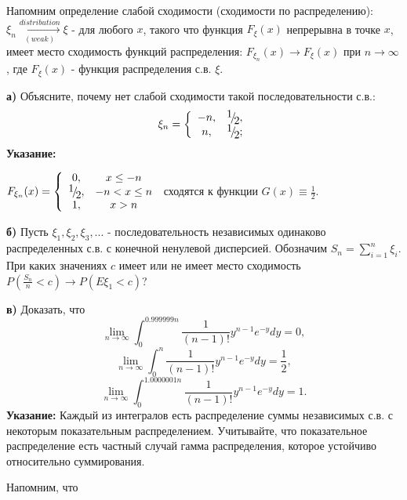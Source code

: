 \begin{problem}
Напомним определение слабой сходимости (сходимости по распределению): $\xi _{n} \mathop{\to }\limits_{(weak)}^{distribution} \xi $ - для любого $x$, такого что функция $F_{\xi } (x)$ непрерывна в точке $x$, имеет место сходимость функций распределения: $F_{\xi _{n} } (x)\to F_{\xi } (x)$ при $n\to \infty $, где $F_{\xi } (x)$ - функция распределения с.в. $\xi $.

\noindent \textbf{а)} Объясните, почему нет слабой сходимости такой последовательности с.в.:
\[\xi _{n} =\left\{\begin{array}{cc} {-n,} & {{\raise0.7ex\hbox{$ 1 $}\!\mathord{\left/ {\vphantom {1 2}} \right. \kern-\nulldelimiterspace}\!\lower0.7ex\hbox{$ 2 $}} ,} \\ {n,} & {{\raise0.7ex\hbox{$ 1 $}\!\mathord{\left/ {\vphantom {1 2}} \right. \kern-\nulldelimiterspace}\!\lower0.7ex\hbox{$ 2 $}} ;} \end{array}\right. \] 
\textbf{Указание: }

\noindent $F_{\xi _{n} } (x)=\left\{\begin{array}{cc} {0,} & {x\le -n} \\ {{\raise0.7ex\hbox{$ 1 $}\!\mathord{\left/ {\vphantom {1 2}} \right. \kern-\nulldelimiterspace}\!\lower0.7ex\hbox{$ 2 $}} ,} & {-n<x\le n} \\ {1,} & {x>n} \end{array}\right. $ сходятся к функции $G(x)\equiv \frac{1}{2} $.

\noindent \textbf{б)} Пусть $\xi _{1} ,\xi _{2} ,\xi _{3} ,...$ - последовательность независимых одинаково распределенных с.в. с конечной ненулевой дисперсией. Обозначим $S_{n} =\sum _{i=1}^{n}\xi _{i}  $. При каких значениях $c$ имеет или не имеет место сходимость $P\left(\frac{S_{n} }{n} <c\right)\to P\left(E\xi _{1} <c\right)$?

\noindent \textbf{в)} Доказать, что
\[\mathop{\lim }\limits_{n\to \infty } \int _{0}^{0.999999n}\frac{1}{(n-1)!} y^{n-1} e^{-y} dy =0,\] 
\[\mathop{\lim }\limits_{n\to \infty } \int _{0}^{n}\frac{1}{(n-1)!} y^{n-1} e^{-y} dy =\frac{1}{2} ,\] 
\[\mathop{\lim }\limits_{n\to \infty } \int _{0}^{1.0000001n}\frac{1}{(n-1)!} y^{n-1} e^{-y} dy =1.\] 
\textbf{Указание:} Каждый из интегралов есть распределение суммы независимых с.в. с некоторым показательным распределением. Учитывайте, что показательное распределение есть частный случай гамма распределения, которое устойчиво относительно суммирования.

\noindent Напомним, что 


\end{problem}
